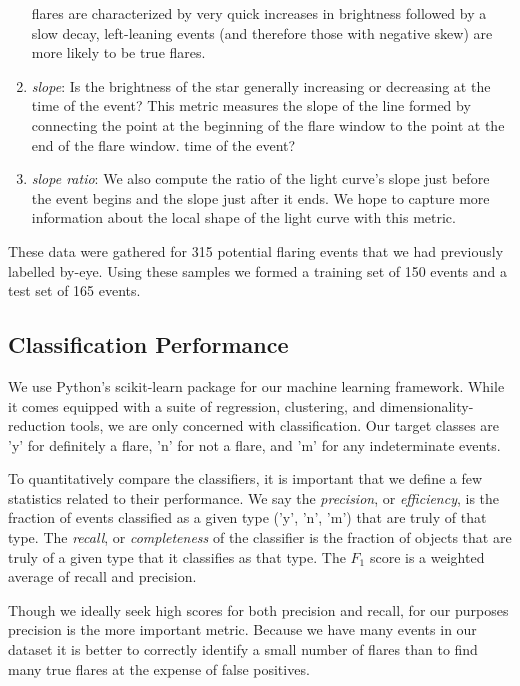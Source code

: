 \documentclass[11pt]{article}
\begin{document}
\begin{enumerate}[(1)]
  flares are characterized by very quick increases in brightness
  followed by a slow decay, left-leaning events (and therefore those
  with negative skew) are more likely to be true flares.
\item \emph{slope}: Is the brightness of the star generally increasing
  or decreasing at the time of the event?  This metric measures the
  slope of the line formed by connecting the point at the beginning of
  the flare window to the point at the end of the flare window.
  time of the event?
\item \emph{slope ratio}: We also compute the ratio of the light
  curve's slope just before the event begins and the slope just after
  it ends.  We hope to capture more information about the local shape
  of the light curve with this metric.
\end{enumerate}
These data were gathered for 315 potential flaring events that we had
previously labelled by-eye.  Using these samples we formed a training
set of 150 events and a test set of 165 events.

\subsection{Classification Performance}
\label{sec:class}
We use Python's scikit-learn package for our machine learning
framework.  While it comes equipped with a suite of regression,
clustering, and dimensionality-reduction tools, we are only concerned
with classification.  Our target classes are 'y' for definitely a
flare, 'n' for not a flare, and 'm' for any indeterminate events.

To quantitatively compare the classifiers, it is important that we
define a few statistics related to their performance.  We say the
\emph{precision}, or \emph{efficiency}, is the fraction of events
classified as a given type ('y', 'n', 'm') that are truly of that
type.  The \emph{recall}, or \emph{completeness} of the classifier is
the fraction of objects that are truly of a given type that it
classifies as that type.  The $F_1$ score is a weighted average of
recall and precision.

Though we ideally seek high scores for both precision and recall, for
our purposes precision is the more important metric.  Because we have
many events in our dataset it is better to correctly identify a small
number of flares than to find many true flares at the expense of false
positives.
\end{document}
